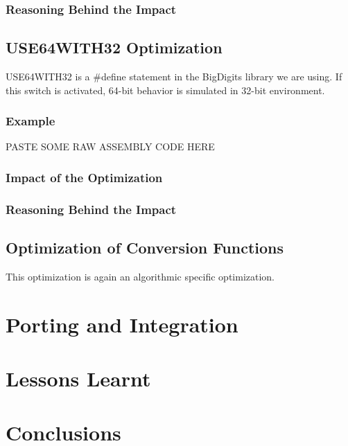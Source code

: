 \documentclass[a4paper]{article}
\begin{document}
	\subsubsection{Reasoning Behind the Impact}
\subsection{USE64WITH32 Optimization}
	USE64WITH32 is a $\#$define statement in the BigDigits library we are using. If this switch is activated, 64-bit behavior is simulated in 32-bit environment.
	\subsubsection{Example}
		PASTE SOME RAW ASSEMBLY CODE HERE
	\subsubsection{Impact of the Optimization}
	\subsubsection{Reasoning Behind the Impact}
\subsection{Optimization of Conversion Functions}
	This optimization is again an algorithmic specific optimization. 
\section{Porting and Integration}

\section{Lessons Learnt}

\section{Conclusions}
\end{document}
